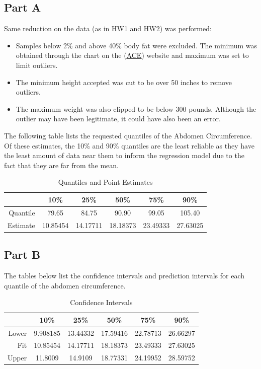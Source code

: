 \documentclass[a4paper, 11pt]{article}
\begin{document}
\subsection*{Part A}
Same reduction on the data (as in HW1 and HW2) was performed:
\begin{itemize}
	\item Samples below 2\% and above 40\% body fat were excluded. The minimum was obtained through the chart on the (\href{''https://www.acefitness.org/acefit/healthy-living-article/60/112/what-are-the-guidelines-for-percentage-of-body-fat-loss''}{\underline{ACE}}) website and maximum was set to limit outliers.
	\item The minimum height accepted was cut to be over 50 inches to remove outliers.
	\item The maximum weight was also clipped to be below 300 pounds. Although the outlier may have been legitimate, it could have also been an error.
\end{itemize}

The following table lists the requested quantiles of the Abdomen Circumference. Of these estimates, the 10\% and 90\% quantiles are the least reliable as they have the least amount of data near them to inform the regression model due to the fact that they are far from the mean.
\begin{table}[H]
	\centering
	\begin{tabular}{r | c | c | c | c | c}
	   & 10\% & 25\% & 50\% & 75\% & 90\% \\ \hline
	 Quantile & 79.65 &  84.75  & 90.90  & 99.05 & 105.40 \\
	 Estimate &10.85454 & 14.17711 &  18.18373 &  23.49333 &  27.63025 
	\end{tabular}
	\caption{Quantiles and Point Estimates}
	\label{table:points}
\end{table}

\subsection*{Part B}
The tables below list the confidence intervals and prediction intervals for each quantile of the abdomen circumference.

\begin{table}[H]
	\centering
	\begin{tabular}{r | c | c | c | c | c}
	   & 10\% & 25\% & 50\% & 75\% & 90\% \\ \hline
	 Lower & 9.908185 & 13.44332 & 17.59416 & 22.78713 & 26.66297 \\
	 Fit &10.85454 & 14.17711 &  18.18373 &  23.49333 &  27.63025 \\
	 Upper & 11.8009 & 14.9109 & 18.77331 & 24.19952 & 28.59752 \\
	\end{tabular}
	\caption{Confidence Intervals}
	\label{table:CI}
\end{table}
\end{document}
